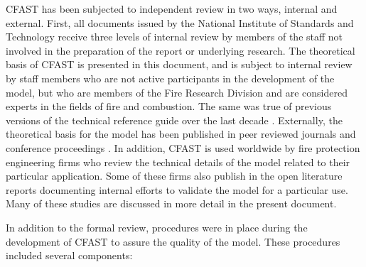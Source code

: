 CFAST has been subjected to independent review in two ways, internal and external. First, all documents issued by the National Institute of Standards and Technology receive three levels of internal review by members of the staff not involved in the preparation of the report or underlying research. The theoretical basis of CFAST is presented in this document, and is subject to internal review by staff members who are not active participants in the development of the model, but who are members of the Fire Research Division and are considered experts in the fields of fire and combustion. The same was true of previous versions of the technical reference guide over the last decade \cite{Models:FAST, Jones:2003, Peacock:1993}.  Externally, the theoretical basis for the model has been published in peer reviewed journals \cite{Jones:1993a, Jones:1985, Jones:1984} and conference proceedings \cite{Jones:1991}. In addition, CFAST is used worldwide by fire protection engineering firms who review the technical details of the model related to their particular application. Some of these firms also publish in the open literature reports documenting internal efforts to validate the model for a particular use. Many of these studies are discussed in more detail in the present document.

In addition to the formal review, procedures were in place during the development of CFAST to assure the quality of the model.  These procedures included several components:

